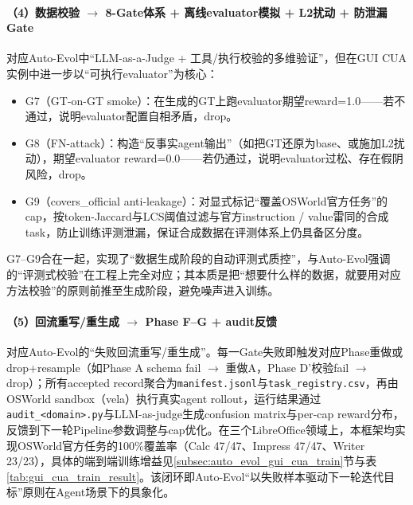 \paragraph{（4）数据校验 $\rightarrow$ 8-Gate体系 + 离线evaluator模拟 + L2扰动 + 防泄漏Gate}
对应Auto-Evol中“LLM-as-a-Judge + 工具/执行校验的多维验证”，但在GUI CUA实例中进一步以“可执行evaluator”为核心：
\begin{itemize}
  \item G7（GT-on-GT smoke）：在生成的GT上跑evaluator期望reward=1.0——若不通过，说明evaluator配置自相矛盾，drop。
  \item G8（FN-attack）：构造“反事实agent输出”（如把GT还原为base、或施加L2扰动），期望evaluator reward=0.0——若仍通过，说明evaluator过松、存在假阴风险，drop。
  \item G9（covers\_official anti-leakage）：对显式标记“覆盖OSWorld官方任务”的cap，按token-Jaccard与LCS阈值过滤与官方instruction / value雷同的合成task，防止训练评测泄漏，保证合成数据在评测体系上仍具备区分度。
\end{itemize}
G7--G9合在一起，实现了“数据生成阶段的自动评测式质控”，与Auto-Evol强调的“评测式校验”在工程上完全对应；其本质是把“想要什么样的数据，就要用对应方法校验”的原则前推至生成阶段，避免噪声进入训练。

\paragraph{（5）回流重写/重生成 $\rightarrow$ Phase F--G + audit反馈}
对应Auto-Evol的“失败回流重写/重生成”。每一Gate失败即触发对应Phase重做或drop+resample（如Phase A schema fail $\rightarrow$ 重做A，Phase D'校验fail $\rightarrow$ drop）；所有accepted record聚合为\texttt{manifest.jsonl}与\texttt{task\_registry.csv}，再由OSWorld sandbox（vela）执行真实agent rollout，运行结果通过\texttt{audit\_<domain>.py}与LLM-as-judge生成confusion matrix与per-cap reward分布，反馈到下一轮Pipeline参数调整与cap优化。在三个LibreOffice领域上，本框架均实现OSWorld官方任务的100\%覆盖率（Calc 47/47、Impress 47/47、Writer 23/23），具体的端到端训练增益见\ref{subsec:auto_evol_gui_cua_train}节与表\ref{tab:gui_cua_train_result}。该闭环即Auto-Evol“以失败样本驱动下一轮迭代目标”原则在Agent场景下的具象化。

